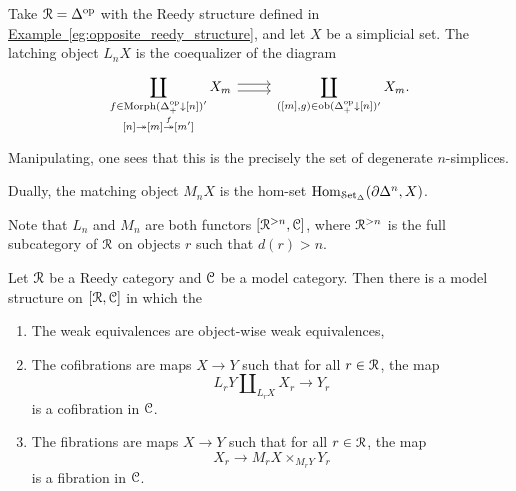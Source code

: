 \documentclass[main.tex]{subfiles}
\begin{document}
\begin{example}
  Take $\mathcal{R} = \Delta^{\mathrm{op}}$ with the Reedy structure defined in \hyperref[eg:opposite_reedy_structure]{Example~\ref*{eg:opposite_reedy_structure}}, and let $X$ be a simplicial set. The latching object $L_{n}X$ is the coequalizer of the diagram
  \begin{equation*}
    \begin{tikzcd}
      \displaystyle\coprod\limits_{\substack{f \in \text{Morph}(\Delta\op_{+} \downarrow [n])' \\ [n] \twoheadrightarrow [m] \overset{f}{\twoheadrightarrow} [m']}} X_{m}
      \arrow[r, shift left]
      \arrow[r, shift right]
      & \displaystyle\coprod\limits_{([m], g) \in \ob(\Delta\op_{+} \downarrow [n])'} X_{m}.
    \end{tikzcd}
  \end{equation*}
  Manipulating, one sees that this is the precisely the set of degenerate $n$-simplices.

  Dually, the matching object $M_{n}X$ is the hom-set $\mathrm{Hom}_{\mathcal{S}\mathrm{et}_{\Delta}}(\partial \Delta^{n}, X)$.
\end{example}

Note that $L_{n}$ and $M_{n}$ are both functors $[\mathcal{R}^{> n}, \mathcal{C}]$, where $\mathcal{R}^{> n}$ is the full subcategory of $\mathcal{R}$ on objects $r$ such that $d(r) > n$.

\begin{theorem}
  Let $\mathcal{R}$ be a Reedy category and $\mathcal{C}$ be a model category. Then there is a model structure on $[\mathcal{R}, \mathcal{C}]$ in which the 
  \begin{enumerate}
    \item The weak equivalences are object-wise weak equivalences,

    \item The cofibrations are maps $X \to Y$ such that for all $r \in \mathcal{R}$, the map
      \begin{equation*}
        L_{r}Y \amalg_{L_{r}X} X_{r} \to Y_{r}
      \end{equation*}
      is a cofibration in $\mathcal{C}$.

    \item The fibrations are maps $X \to Y$ such that for all $r \in \mathcal{R}$, the map
      \begin{equation*}
        X_{r} \to M_{r}X \times_{M_{r}Y} Y_{r}
      \end{equation*}
      is a fibration in $\mathcal{C}$.
  \end{enumerate}
\end{theorem}
\end{document}
